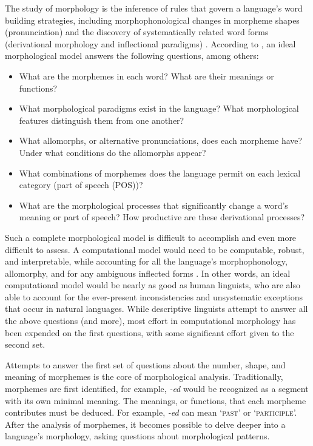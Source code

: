 \documentclass[12pt]{article}
\begin{document}
The study of morphology is the inference of rules that govern a language’s word building strategies, including morphophonological changes in morpheme shapes (pronunciation) and the discovery of systematically related word forms (derivational morphology and inflectional paradigms) \cite{roark_computational_2007}. According to , an ideal morphological model answers the following questions, among others:\begin{singlespace}

\smallskip
\begin{itemize}
    \item What are the morphemes in each word? What are their meanings or functions? 
    \item What morphological paradigms exist in the language? What morphological features distinguish them from one another?
    \item What allomorphs, or alternative pronunciations, does each morpheme have? Under what conditions do the allomorphs appear?  
    \item What combinations of morphemes does the language permit on each lexical category (part of speech (POS))?
    \item What are the morphological processes that significantly change a word's meaning or part of speech? How productive are these derivational processes?
\end{itemize}
\end{singlespace}
\smallskip

Such a complete morphological model is difficult to accomplish and even more difficult to assess. A computational model would need to be computable, robust, and interpretable, while accounting for all the language's morphophonology, allomorphy, and for any ambiguous inflected forms \cite{virpioja_empirical_2011}. In other words, an ideal computational model would be nearly as good as human linguists, who are also able to account for the ever-present inconsistencies and unsystematic exceptions that occur in natural languages. While descriptive linguists attempt to answer all the above questions (and more), most effort in computational morphology has been expended on the first questions, with some significant effort given to the second set. 

Attempts to answer the first set of questions about the number, shape, and meaning of morphemes is the core of morphological analysis. Traditionally, morphemes are first identified, for example, \textit{-ed} would be recognized as a segment with its own minimal meaning. The meanings, or functions, that each morpheme contributes must be deduced. For example, \textit{-ed} can mean `\textsc{past}' or `\textsc{participle}'. After the analysis of morphemes, it becomes possible to delve deeper into a language's morphology, asking questions about morphological patterns. 
\end{document}
